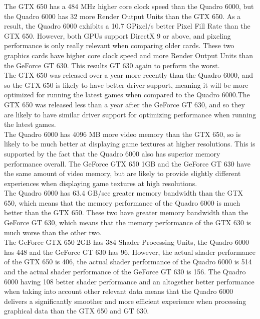 \documentclass[paper=a4, fontsize=11pt]{scrartcl}
\numberwithin{equation}{section}		%
\numberwithin{figure}{section}			%
\numberwithin{table}{section}				%
\begin{document}
The GTX 650 has a 484 MHz higher core clock speed than the Quadro 6000, but the Quadro 6000 has 32 more Render Output Units than the GTX 650. As a result, the Quadro 6000 exhibits a 10.7 GPixel/s better Pixel Fill Rate than the GTX 650. However, both GPUs support DirectX 9 or above, and pixeling performance is only really relevant when comparing older cards. These two graphics cards have higher core clock speed and more Render Output Units than the GeForce GT 630. This results GT 630 again to perform the worst.\\


The GTX 650 was released over a year more recently than the Quadro 6000, and so the GTX 650 is likely to have better driver support, meaning it will be more optimized for running the latest games when compared to the Quadro 6000.The GTX 650 was released less than a year after the GeForce GT 630, and so they are likely to have similar driver support for optimizing performance when running the latest games. \\


The Quadro 6000 has 4096 MB more video memory than the GTX 650, so is likely to be much better at displaying game textures at higher resolutions. This is supported by the fact that the Quadro 6000 also has superior memory performance overall. The GeForce GTX 650 1GB and the GeForce GT 630 have the same amount of video memory, but are likely to provide slightly different experiences when displaying game textures at high resolutions.\\


The Quadro 6000 has 63.4 GB/sec greater memory bandwidth than the GTX 650, which means that the memory performance of the Quadro 6000 is much better than the GTX 650. These two have greater memory bandwidth than the GeForce GT 630, which means that the memory performance of the GTX 630 is much worse than the other two. \\


The GeForce GTX 650 2GB has 384 Shader Processing Units, the Quadro 6000 has 448 and the GeForce GT 630 has 96. However, the actual shader performance of the GTX 650 is 406, the actual shader performance of the Quadro 6000 is 514 and the actual shader performance of the GeForce GT 630 is 156. The Quadro 6000 having 108 better shader performance and an altogether better performance when taking into account other relevant data means that the Quadro 6000 delivers a significantly smoother and more efficient experience when processing graphical data than the GTX 650 and GT 630. \\
\end{document}
